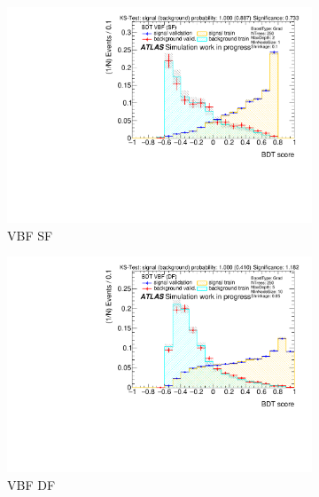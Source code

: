 \begin{figure}[htbp]
    \centering
    \begin{subfigure}[t]{0.49\textwidth}
        \includegraphics[width=\textwidth]{./plots/mva/scan/VBF_SF_bdt_output.pdf}
        \caption{VBF SF}
    \end{subfigure}
    \begin{subfigure}[t]{0.49\textwidth}
        \includegraphics[width=\textwidth]{./plots/mva/scan/VBF_DF_bdt_output.pdf}
        \caption{VBF DF}
    \end{subfigure}
    \begin{subfigure}[t]{0.49\textwidth}

\end{subfigure}
\end{figure}
